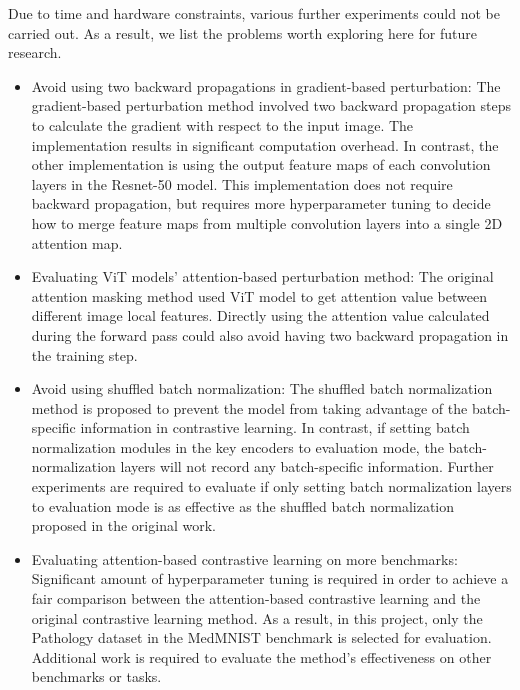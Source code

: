 \documentclass[12pt,twoside]{report}
\begin{document}
Due to time and hardware constraints, various further experiments could not be carried out. As a result, we list the problems worth exploring here for future research. 
\begin{itemize}

\item Avoid using two backward propagations in gradient-based perturbation: The gradient-based perturbation method involved two backward propagation steps to calculate the gradient with respect to the input image. The implementation results in significant computation overhead. In contrast, the other implementation is using the output feature maps of each convolution layers in the Resnet-50 model. This implementation does not require backward propagation, but requires more hyperparameter tuning to decide how to merge feature maps from multiple convolution layers into a single 2D attention map. 

\item Evaluating ViT models' attention-based perturbation method: The original attention masking method used ViT model to get attention value between different image local features. Directly using the attention value calculated during the forward pass could also avoid having two backward propagation in the training step.

\item Avoid using shuffled batch normalization: The shuffled batch normalization method is proposed to prevent the model from taking advantage of the batch-specific information in contrastive learning. In contrast, if setting batch normalization modules in the key encoders to evaluation mode, the batch-normalization layers will not record any batch-specific information. Further experiments are required to evaluate if only setting batch normalization layers to evaluation mode is as effective as the shuffled batch normalization proposed in the original work.

\item Evaluating attention-based contrastive learning on more benchmarks: Significant amount of hyperparameter tuning is required in order to achieve a fair comparison between the attention-based contrastive learning and the original contrastive learning method. As a result, in this project, only the Pathology dataset in the MedMNIST benchmark is selected for evaluation. Additional work is required to evaluate the method's effectiveness on other benchmarks or tasks. 

\end{itemize}
\end{document}
